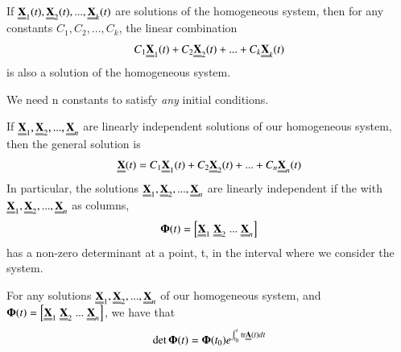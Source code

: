 \documentclass[12pt, a4paper, oneside, openright, titlepage]{book}
\begin{document}


\begin{thm}
        If $\Emph{X}_1(t), \Emph{X}_2(t),...,\Emph{X}_k(t)$ are solutions of the homogeneous system, then for any constants $C_1,C_2,...,C_k$, the linear combination \begin{equation}
                C_1\Emph{X}_1(t)+ C_2\Emph{X}_2(t)+...+C_k\Emph{X}_k(t)
        \end{equation}
        is also a solution of the homogeneous system.
\end{thm}

\begin{note}[In General]
        We need n constants to satisfy \emph{any} initial conditions.
\end{note}


\begin{thm}
        If $\Emph{X}_1,\Emph{X}_2,...,\Emph{X}_n$ are linearly independent solutions of our homogeneous system, then the general solution is \begin{equation}
                \Emph{X}(t) = C_1\Emph{X}_1(t)+C_2\Emph{X}_2(t)+...+C_n\Emph{X}_n(t)
        \end{equation}
        In particular, the solutions $\Emph{X}_1,\Emph{X}_2,...,\Emph{X}_n$ are linearly independent if the  with $\Emph{X}_1,\Emph{X}_2,...,\Emph{X}_n$ as columns, \begin{equation}
                \boldsymbol{\Phi}(t) = \left[\Emph{X}_1\;\Emph{X}_2\;...\;\Emph{X}_n\right]
        \end{equation}
        has a non-zero determinant at a point, t, in the interval where we consider the system.
\end{thm}



\begin{thm}
        For any solutions $\Emph{X}_1,\Emph{X}_2,...,\Emph{X}_n$ of our homogeneous system, and $\boldsymbol{\Phi}(t) = \left[\Emph{X}_1\;\Emph{X}_2\;...\;\Emph{X}_n\right]$, we have that \begin{equation}
                \det\boldsymbol{\Phi}(t) = \boldsymbol{\Phi}(t_0)e^{\int_{t_0}^t\text{tr}\Emph{A}(t)dt}
        \end{equation}
\end{thm}


\end{document}
